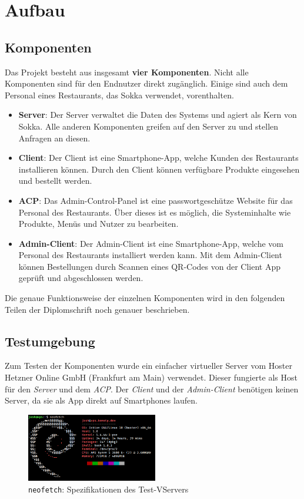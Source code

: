\chapter{Aufbau}

\section{Komponenten}

Das Projekt besteht aus insgesamt \textbf{vier Komponenten}. Nicht alle Komponenten sind für den Endnutzer direkt zugänglich. Einige sind auch dem Personal eines Restaurants, das Sokka verwendet, vorenthalten.

\begin{itemize}
    \item \textbf{Server}: Der Server verwaltet die Daten des Systems und agiert als Kern von Sokka. Alle anderen Komponenten greifen auf den Server zu und stellen Anfragen an diesen.
    \item \textbf{Client}: Der Client ist eine Smartphone-App, welche Kunden des Restaurants installieren können. Durch den Client können verfügbare Produkte eingesehen und bestellt werden.
    \item \textbf{ACP}: Das Admin-Control-Panel ist eine passwortgeschütze Website für das Personal des Restaurants. Über dieses ist es möglich, die Systeminhalte wie Produkte, Menüs und Nutzer zu bearbeiten.
    \item \textbf{Admin-Client}: Der Admin-Client ist eine Smartphone-App, welche vom Personal des Restaurants installiert werden kann. Mit dem Admin-Client können Bestellungen durch Scannen eines QR-Codes von der Client App geprüft und abgeschlossen werden.
\end{itemize}

Die genaue Funktionsweise der einzelnen Komponenten wird in den folgenden Teilen der Diplomschrift noch genauer beschrieben.

\section{Testumgebung}

Zum Testen der Komponenten wurde ein einfacher virtueller Server vom Hoster Hetzner Online GmbH (Frankfurt am Main) verwendet. Dieser fungierte als Host für den \textit{Server} und dem \textit{ACP}. Der \textit{Client} und der \textit{Admin-Client} benötigen keinen Server, da sie als App direkt auf Smartphones laufen.

\begin{figure}[ht]
    \centering
    \includegraphics[width=0.51\textwidth]{images/Intro/specs.png}
    \caption{\lstinline{neofetch}: Spezifikationen des Test-VServers}
\end{figure}

